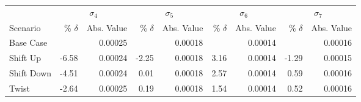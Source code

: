 \begin{table}[H]
	\centering
	\setlength{\tabcolsep}{5pt}
	\begin{threeparttable}
		\begin{tabular}{l *{4}{rr}}
			           & \multicolumn{2}{c}{$\sigma_4$} & \multicolumn{2}{c}{$\sigma_5$} & \multicolumn{2}{c}{$\sigma_6$} & \multicolumn{2}{c}{$\sigma_7$}                                                       \\
			\cmidrule(lr){2-3} \cmidrule(lr){4-5} \cmidrule(lr){6-7} \cmidrule(lr){8-9}
			Scenario   & \% $\delta$                    & Abs. Value                     & \% $\delta$                    & Abs. Value                     & \% $\delta$ & Abs. Value & \% $\delta$ & Abs. Value \\
			\midrule

			Base Case  &                                & 0.00025                        &                                & 0.00018                        &             & 0.00014    &             & 0.00016    \\
			Shift Up   & -6.58                          & 0.00024                        & -2.25                          & 0.00018                        & 3.16        & 0.00014    & -1.29       & 0.00015    \\
			Shift Down & -4.51                          & 0.00024                        & 0.01                           & 0.00018                        & 2.57        & 0.00014    & 0.59        & 0.00016    \\
			Twist      & -2.64                          & 0.00025                        & 0.19                           & 0.00018                        & 1.54        & 0.00014    & 0.52        & 0.00016    \\
			\bottomrule
		\end{tabular}
	\end{threeparttable}
\end{table}

